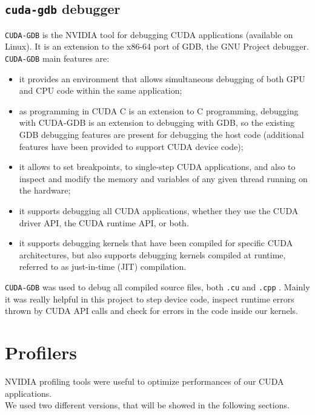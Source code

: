 	\subsection{\texttt{cuda-gdb} debugger}
	\texttt{CUDA-GDB} is the NVIDIA tool for debugging CUDA applications (available on Linux). It is an extension to the x86-64 port of GDB, the GNU Project debugger\cite{cudagdbdoc}.\\
	\texttt{CUDA-GDB} main features are:
	\begin{itemize}
		\item it provides an environment that allows simultaneous debugging of both GPU and CPU code within the same application;
		
		\item as programming in CUDA C is an extension to C programming, debugging with CUDA-GDB is an extension to debugging with GDB, so the existing GDB debugging features are present for debugging the host code (additional features have been provided to support CUDA device code);	
		
		\item it allows to set breakpoints, to single-step CUDA applications, and also to inspect and modify the memory and variables of any given thread running on the hardware;
		
		\item it supports debugging all CUDA applications, whether they use the CUDA driver API, the CUDA runtime API, or both.
		
		\item it supports debugging kernels that have been compiled for specific CUDA architectures, but also supports debugging kernels compiled at runtime, referred to as just-in-time (JIT) compilation\cite{cudagdbdoc}.
	\end{itemize}	
	\texttt{CUDA-GDB} was used to debug all compiled source files, both \texttt{.cu} and \texttt{.cpp} .
	Mainly it was really helpful in this project to step device code, inspect runtime errors thrown by CUDA API calls and check for errors in the code inside our kernels.





\section{Profilers}	
	NVIDIA profiling tools were useful to optimize performances of our CUDA applications.\\
	We used two different versions, that will be showed in the following sections.
		
